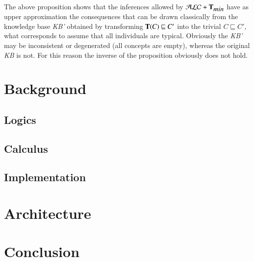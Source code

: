 \documentclass[a4paper, 11pt, oneside]{elsarticle}
\newcommand{\tip}{{\bf T}}
\newcommand{\alctmin}{\mathcal{ALC}+\tip_{\mbox{\em min}}}
\newcommand{\sqset}{\sqsubseteq}
\begin{document}
 The above proposition shows that the inferences
allowed by $\alctmin$ have as  upper approximation the
consequences that can be drawn classically from the knowledge base
\emph{KB'} obtained by  transforming $\tip(C) \sqset C'$ into the
trivial  $C \sqset C'$, what corresponds to  assume that all
individuals are typical. Obviously the \emph{KB'} may be
inconsistent or degenerated (all concepts are empty), whereas the
original \emph{KB} is not. For this reason the inverse of
the proposition obviously does not hold.




\chapter{Background}
\section{Logics}
\section{Calculus}
\section{Implementation}

\chapter{Architecture}

\chapter{Conclusion}








\end{document}

